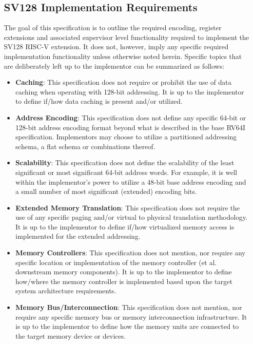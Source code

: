 \documentclass{article}
\begin{document}
\subsection{SV128 Implementation Requirements}

The goal of this specification is to outline the required encoding, register extensions 
and associated supervisor level functionality required to implement the SV128 
RISC-V extension.  It does not, however, imply any specific required implementation 
functionality unless otherwise noted herein.  Specific topics that are deliberately 
left up to the implementor can be summarized as follows:

\begin{itemize}
\item \textbf{Caching}: This specification does not require or prohibit the use of data caching 
when operating with 128-bit addressing.  It is up to the implementor to define if/how data caching 
is present and/or utilized.  

\item \textbf{Address Encoding}: This specification does not define any specific 64-bit or 128-bit 
address encoding format beyond what is described in the base RV64I specification.  Implementors 
may choose to utilize a partitioned addressing schema, a flat schema or combinations thereof.    

\item \textbf{Scalability}: This specification does not define the scalability of the least significant 
or most significant 64-bit address words.  For example, it is well within the implementor's power to 
utilize a 48-bit base address encoding and a small number of most significant (extended) encoding bits.

\item \textbf{Extended Memory Translation}: This specification does not require the use of any 
specific paging and/or virtual to physical translation methodology.  It is up to the implementor to define 
if/how virtualized memory access is implemented for the extended addressing.

\item \textbf{Memory Controllers}: This specification does not mention, nor require any specific 
location or implementation of the memory controller (et al. downstream memory components).  It is 
up to the implementor to define how/where the memory controller is implemented based upon the 
target system architecture requirements.

\item \textbf{Memory Bus/Interconnection}: This specification does not mention, nor require any 
specific memory bus or memory interconnection infrastructure.  It is up to the implementor to define 
how the memory units are connected to the target memory device or devices.


\end{itemize}
\end{document}
